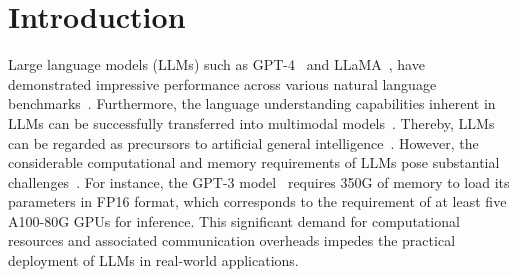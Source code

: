 \documentclass{article} %
\begin{document}
\begin{abstract}



\end{abstract}

\section{Introduction}

Large language models (LLMs) such as GPT-4~\citep{gpt4} and LLaMA~\citep{llama}, have demonstrated impressive performance across various natural language benchmarks~\citep{mmlu,hellaswag}.
%
Furthermore, the language understanding capabilities inherent in LLMs can be successfully transferred into multimodal models~\citep{embodiedgpt,lvlm-ehub,meta-transformer,huang2024leveraging,huang2023geometric}. Thereby, LLMs can be regarded as precursors to artificial general intelligence~\citep{gpt4}.
%
However, the considerable computational and memory requirements of LLMs pose substantial challenges~\citep{dsnt,hu2023you}. For instance, the GPT-3 model~\citep{gpt3} requires 350G of memory to load its parameters in FP16 format, which corresponds to the requirement of at least five A100-80G GPUs for inference.
%
This significant demand for computational resources and associated communication overheads impedes the practical deployment of LLMs in real-world applications.
\end{document}
